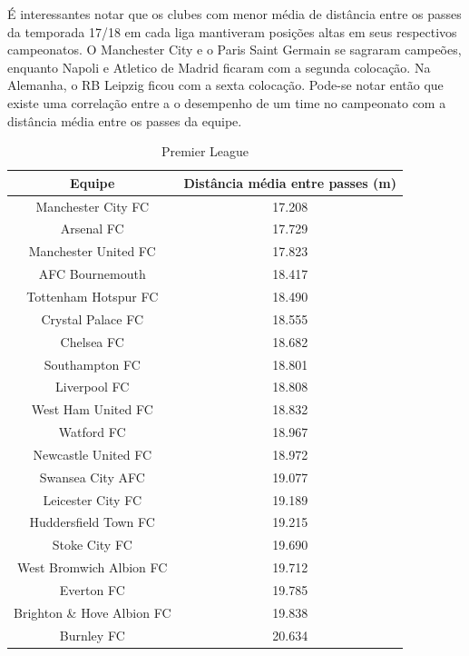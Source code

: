 \documentclass{article}
\begin{document}
É interessantes notar que os clubes com menor média de distância entre os
passes da temporada 17/18 em cada liga mantiveram posições altas em seus
respectivos campeonatos. O Manchester City e o Paris Saint Germain se sagraram
campeões, enquanto Napoli e Atletico de Madrid ficaram com a segunda colocação.
Na Alemanha, o RB Leipzig ficou com a sexta colocação. Pode-se notar então que
existe uma correlação entre a o desempenho de um time no campeonato com a
distância média entre os passes da equipe.

\begin{table}[H]
    \centering
    \begin{tabular}{|c|c|}
        \hline
        \textbf{Equipe}            & \textbf{Distância média entre passes (m)}
        \\ \hline
        Manchester City FC         & 17.208
        \\ \hline
        Arsenal FC                 & 17.729
        \\ \hline
        Manchester United FC       & 17.823
        \\ \hline
        AFC Bournemouth            & 18.417
        \\ \hline
        Tottenham Hotspur FC       & 18.490
        \\ \hline
        Crystal Palace FC          & 18.555
        \\ \hline
        Chelsea FC                 & 18.682
        \\ \hline
        Southampton FC             & 18.801
        \\ \hline
        Liverpool FC               & 18.808
        \\ \hline
        West Ham United FC         & 18.832
        \\ \hline
        Watford FC                 & 18.967
        \\ \hline
        Newcastle United FC        & 18.972
        \\ \hline
        Swansea City AFC           & 19.077
        \\ \hline
        Leicester City FC          & 19.189
        \\ \hline
        Huddersfield Town FC       & 19.215
        \\ \hline
        Stoke City FC              & 19.690
        \\ \hline
        West Bromwich Albion FC    & 19.712
        \\ \hline
        Everton FC                 & 19.785
        \\ \hline
        Brighton \& Hove Albion FC & 19.838
        \\ \hline
        Burnley FC                 & 20.634
        \\ \hline
    \end{tabular}
    \caption{Premier League}
    \label{tab:average_distance_england}
\end{table}
\end{document}
